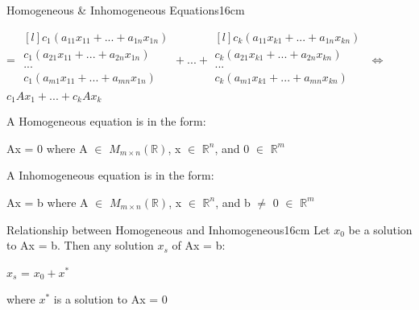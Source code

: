 \begin{definition}{Homogeneous \& Inhomogeneous Equations}{16cm}
\begin{boxedminipage}{16cm}
            \hspace{0.5cm}
            =
            $\begin{matrix*}[l]
                c_1(a_{11}x_{11} + ... + a_{1n}x_{1n}) \\
                c_1(a_{21}x_{11} + ... + a_{2n}x_{1n}) \\
                ... \\
                c_1(a_{m1}x_{11} + ... + a_{mn}x_{1n}) \\
            \end{matrix*} + ... +
            \begin{matrix*}[l]
                c_k(a_{11}x_{k1} + ... + a_{1n}x_{kn}) \\
                c_k(a_{21}x_{k1} + ... + a_{2n}x_{kn}) \\
                ... \\
                c_k(a_{m1}x_{k1} + ... + a_{mn}x_{kn}) \\
            \end{matrix*}$
            $\Leftrightarrow$ $c_1Ax_1 + ... + c_kAx_k$
        \end{boxedminipage}

        \vspace{0.3cm}

        A {\color{lblue} Homogeneous equation} is in the form:

        \hspace{0.5cm}
        Ax = 0
        \hspace{1cm}
        where A $\in$ $M_{m \times n}(\mathbb{R})$,
        x $\in$ $\mathbb{R}^n$,
        and 0 $\in$ $\mathbb{R}^m$

        A {\color{lblue} Inhomogeneous equation} is in the form:

        \hspace{0.5cm}
        Ax = b
        \hspace{1cm}
        where A $\in$ $M_{m \times n}(\mathbb{R})$,
        x $\in$ $\mathbb{R}^n$,
        and b $\not =$ 0 $\in$ $\mathbb{R}^m$
    \end{definition}

    \vspace{0.5cm}



    \begin{wtheorem}{Relationship between Homogeneous and Inhomogeneous}{16cm}
        Let $x_0$ be a solution to Ax = b. Then any solution $x_s$ of Ax = b:

        \hspace{0.5cm}
        $x_s$ = $x_0 + x^*$

        where $x^*$ is a solution to Ax = 0
    \end{wtheorem}

